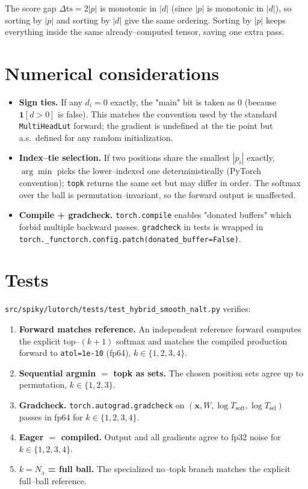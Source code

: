 \documentclass[11pt]{article}
\newcommand{\NAP}{N_{\!\text{a}}}
\newcommand{\nalt}{k}
\newcommand{\bts}{\mathrm{ts}}
\begin{document}
The score gap $\Delta\bts = 2|p|$ is monotonic in $|d|$ (since $|p|$ is monotonic
in $|d|$), so sorting by $|p|$ and sorting by $|d|$ give the same ordering.
Sorting by $|p|$ keeps everything inside the same already--computed tensor,
saving one extra pass.

\section{Numerical considerations}

\begin{itemize}
  \item \textbf{Sign ties.} If any $d_i = 0$ exactly, the "main" bit is taken
        as $0$ (because $\mathbf{1}[d > 0]$ is false). This matches the
        convention used by the standard \texttt{MultiHeadLut} forward; the
        gradient is undefined at the tie point but a.s.\ defined for any
        random initialization.
  \item \textbf{Index--tie selection.} If two positions share the smallest
        $|p_i|$ exactly, $\arg\min$ picks the lower--indexed one
        deterministically (PyTorch convention); \texttt{topk} returns the same
        set but may differ in order. The softmax over the ball is
        permutation--invariant, so the forward output is unaffected.
  \item \textbf{Compile + gradcheck.} \texttt{torch.compile} enables "donated
        buffers" which forbid multiple backward passes. \texttt{gradcheck} in
        tests is wrapped in
        \verb|torch._functorch.config.patch(donated_buffer=False)|.
\end{itemize}

\section{Tests}

\texttt{src/spiky/lutorch/tests/test\_hybrid\_smooth\_nalt.py} verifies:
\begin{enumerate}
  \item \textbf{Forward matches reference.} An independent reference forward
        computes the explicit top--$(\nalt{+}1)$ softmax and matches the
        compiled production forward to \texttt{atol=1e-10} (fp64),
        $\nalt \in \{1,2,3,4\}$.
  \item \textbf{Sequential argmin $=$ topk as sets.} The chosen position
        sets agree up to permutation, $\nalt \in \{1,2,3\}$.
  \item \textbf{Gradcheck.} \texttt{torch.autograd.gradcheck} on
        $(\bm{x}, W, \log T_{\!\text{soft}}, \log T_{\!\text{sel}})$ passes in
        fp64 for $\nalt \in \{1,2,3,4\}$.
  \item \textbf{Eager $=$ compiled.} Output and all gradients agree to
        fp32 noise for $\nalt \in \{1,2,3,4\}$.
  \item \textbf{$\nalt = \NAP$ = full ball.} The specialized
        no--topk branch matches the explicit full--ball reference.
\end{enumerate}
\end{document}
